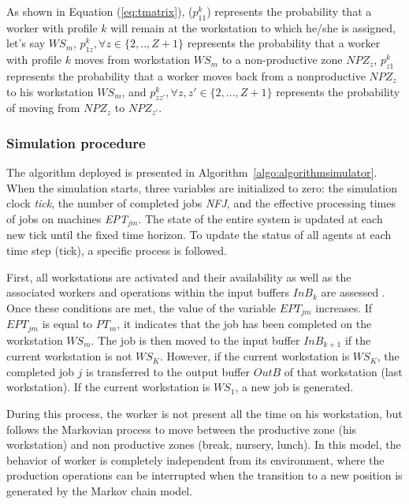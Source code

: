 \documentclass[review,12pt, 3p, times]{elsarticle}
\begin{document}
As shown in Equation (\ref{eq:tmatrix}), ($p_{11}^k$) represents the probability that a worker with profile $k$ will remain at the workstation to which he/she is assigned, let's say $\textit{WS}_m$, $p_{1z}^k, \forall z\in \{2,..,Z+1\}$ represents the probability that a worker with profile $k$ moves from  workstation $\textit{WS}_m$ to a non-productive zone $\textit{NPZ}_z$, $p_{z1}^k$ represents the probability that a worker moves back from a nonproductive $\textit{NPZ}_z$ to his workstation $\textit{WS}_m$, and $p_{zz'}^k, \forall z,z'\in \{2,...,Z+1\} $ represents the probability of moving from $\textit{NPZ}_{z}$ to $\textit{NPZ}_{z'}$.
	
\subsubsection{Simulation procedure}
The algorithm deployed is presented in Algorithm~\ref{algo:algorithmsimulator}. When the simulation starts, three variables are initialized to zero: the simulation clock \textit{tick}, the number of completed jobs \textit{NFJ}, and the effective processing times of jobs on machines \textit{EPT}$_{jm}$. The state of the entire system is updated at each new tick until the fixed time horizon. To update the status of all agents at each time step (tick), a specific process is followed.
	    
First, all workstations are activated and their availability as well as the associated workers and operations within the input buffers $InB_{k}$ are assessed . Once these conditions are met, the value of the variable $EPT_{jm}$ increases. If $EPT_{jm}$ is equal to $PT_{m}$, it indicates that the job has been completed on the workstation $\textit{WS}_m$. The job is then moved to the input buffer $InB_{k+1}$ if the current workstation is not $\textit{WS}_K$. However, if the current workstation is $\textit{WS}_K$, the completed job $j$ is transferred to the output buffer $OutB$ of that workstation (last workstation). If the current workstation is $\textit{WS}_1$, a new job is generated. 

During this process, the worker is not present all the time on his workstation, but follows the Markovian process to move between the productive zone (his workstation) and non productive zones (break, nursery, lunch). In this model, the behavior of worker is completely independent from its environment, where the production operations can be interrupted when the transition to a new position is generated by the Markov chain model.
\end{document}

